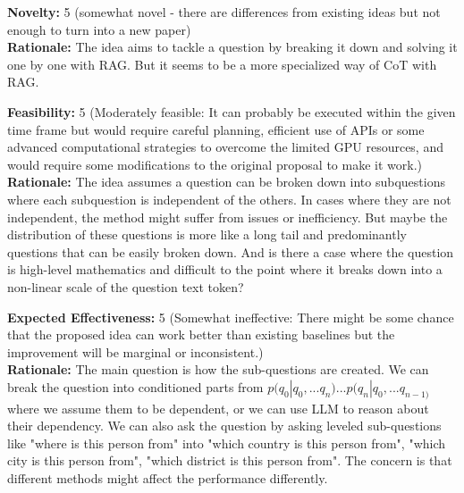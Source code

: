 \vspace{20pt}

\begin{tcolorbox}[colback=green!10!white, colframe=green!80!black, title=\textbf{Reviewer 3}]
\small
\textbf{Novelty:} 5 (somewhat novel - there are differences from existing ideas but not enough to turn into a new paper)\\
\textbf{Rationale:} The idea aims to tackle a question by breaking it down and solving it one by one with RAG. But it seems to be a more specialized way of CoT with RAG.

\vspace{10pt}

\textbf{Feasibility:} 5 (Moderately feasible: It can probably be executed within the given time frame but would require careful planning, efficient use of APIs or some advanced computational strategies to overcome the limited GPU resources, and would require some modifications to the original proposal to make it work.)\\
\textbf{Rationale:} The idea assumes a question can be broken down into subquestions where each subquestion is independent of the others. In cases where they are not independent, the method might suffer from issues or inefficiency. But maybe the distribution of these questions is more like a long tail and predominantly questions that can be easily broken down. And is there a case where the question is high-level mathematics and difficult to the point where it breaks down into a non-linear scale of the question text token?

\vspace{10pt}

\textbf{Expected Effectiveness:} 5 (Somewhat ineffective: There might be some chance that the proposed idea can work better than existing baselines but the improvement will be marginal or inconsistent.)\\
\textbf{Rationale:} The main question is how the sub-questions are created. We can break the question into conditioned parts from $p(q_0|q_0, ... q_n) ... p(q_n|q_0, ... q_{n-1)}$ where we assume them to be dependent, or we can use LLM to reason about their dependency. We can also ask the question by asking leveled sub-questions like "where is this person from" into "which country is this person from", "which city is this person from", "which district is this person from". The concern is that different methods might affect the performance differently.

\vspace{10pt}


\end{tcolorbox}

